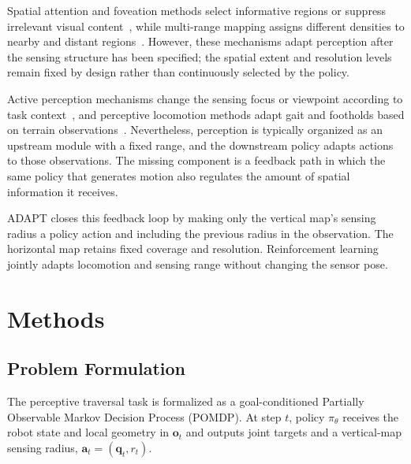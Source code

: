 \documentclass[letterpaper, 10 pt, conference]{ieeeconf/ieeeconf}
\DeclareRobustCommand{\RevisionAdd}[1]{{\color{red}#1}}
\begin{document}
Spatial attention and foveation methods select informative regions or suppress irrelevant visual content~\cite{Wang_2025_AdaptiveVision,Zhang_2026_FocusNav}, while multi-range mapping assigns different densities to nearby and distant regions~\cite{Patel_2024_RoadRunnerMM}. However, these mechanisms adapt perception after the sensing structure has been specified; the spatial extent and resolution levels remain fixed by design rather than continuously selected by the policy.

Active perception mechanisms change the sensing focus or viewpoint according to task context~\cite{Liu_2026_ActiveVLA}, and perceptive locomotion methods adapt gait and footholds based on terrain observations~\cite{zhuang2024humanoid,long2025learning,wang2025beamdojo,ren2025vb}. Nevertheless, perception is typically organized as an upstream module with a fixed range, and the downstream policy adapts actions to those observations. The missing component is a feedback path in which the same policy that generates motion also regulates the amount of spatial information it receives.

\RevisionAdd{ADAPT closes this feedback loop by making only the vertical map's sensing radius a policy action and including the previous radius in the observation. The horizontal map retains fixed coverage and resolution. Reinforcement learning jointly adapts locomotion and sensing range without changing the sensor pose.}


\section{Methods}
\subsection{Problem Formulation}
The perceptive traversal task is formalized as a goal-conditioned Partially Observable Markov Decision Process (POMDP). \RevisionAdd{At step $t$, policy $\pi_\theta$ receives the robot state and local geometry in $\mathbf{o}_t$ and outputs joint targets and a vertical-map sensing radius, $\mathbf{a}_t=(\mathbf{q}_t,r_t)$}.
\end{document}
